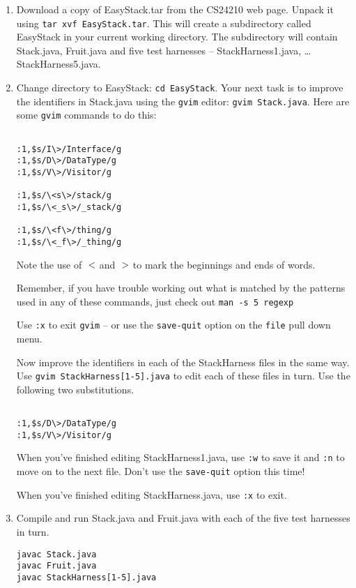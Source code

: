 \begin{enumerate}

\item Download a copy of EasyStack.tar from the CS24210 web page. Unpack it
using {\tt tar xvf EasyStack.tar}.  This will create a subdirectory called
EasyStack in your current working directory.  The subdirectory will contain
Stack.java, Fruit.java and five test harnesses --  StackHarness1.java, \ldots StackHarness5.java.

\item Change directory to EasyStack: {\tt cd EasyStack}.  Your next
task is to improve the identifiers in Stack.java using the {\tt gvim}
editor: {\tt gvim Stack.java}.  Here are some {\tt gvim} commands to do this:

\begin{verbatim}

:1,$s/I\>/Interface/g
:1,$s/D\>/DataType/g
:1,$s/V\>/Visitor/g

:1,$s/\<s\>/stack/g
:1,$s/\<_s\>/_stack/g

:1,$s/\<f\>/thing/g
:1,$s/\<_f\>/_thing/g

\end{verbatim}

Note the use of $\\<$ and 
$\\>$ to mark the beginnings and
ends of words.

Remember, if you have trouble working out what is matched by 
the patterns used in any of these commands, just check out 
{\tt man -s 5 regexp}

Use {\tt :x} to exit {\tt gvim} -- or use the {\tt save-quit} option on
the {\tt file} pull down menu.

Now improve the identifiers in each of the StackHarness files in the
same way.  Use {\tt gvim StackHarness[1-5].java} to edit each of these
files in turn.  Use the following two substitutions. 
\begin{verbatim}

:1,$s/D\>/DataType/g
:1,$s/V\>/Visitor/g

\end{verbatim}

When you've finished editing StackHarness1.java, use
{\tt :w} to save it and {\tt :n} to move on to the next file.  Don't use
the {\tt save-quit} option this time! 

When you've finished editing StackHarness.java, use {\tt :x} to exit.

\item Compile and run Stack.java and Fruit.java with each of the five
test harnesses in turn.
\begin{verbatim}
javac Stack.java
javac Fruit.java
javac StackHarness[1-5].java


\end{verbatim}
\end{enumerate}
